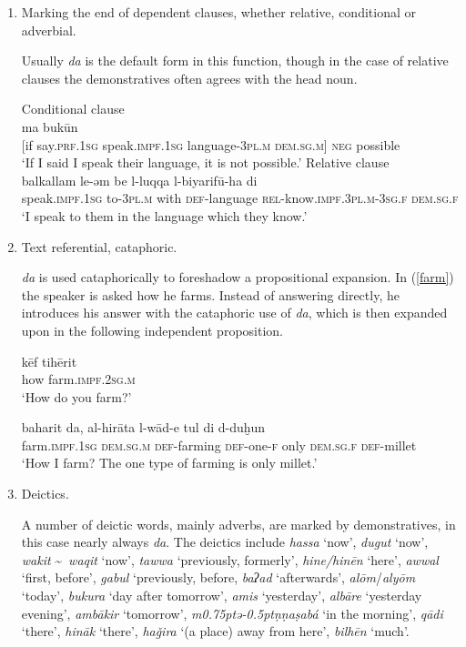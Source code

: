 \documentclass[output=paper]{langsci/langscibook}
\begin{document}
\begin{enumerate}[leftmargin=*]

\item Marking the end of dependent clauses, whether {relative}, {conditional} or adverbial.

Usually \textit{da} is the default form in this function, though in the case of {relative} clauses the {demonstratives} often agrees with the head noun.


\ea\label{gul}
 {\label{bkm:Ref520916112}Conditional clause}\\
 ma bukūn\\
     [if say.\textsc{prf.1sg} speak.\textsc{impf.1sg} language-\textsc{3pl.m} \textsc{dem.sg.m]} \textsc{neg} possible\\
\glt ‘If I said I speak their language, it is not possible.’
\ex \label{luqqa}
{}{}{\label{bkm:Ref520916704}Relative clause}\\
\gll balkallam le-əm be l-luqqa l-biyarifū-ha di\\
     speak.\textsc{impf.1sg} to-\textsc{3pl.m} with \textsc{def}-language \textsc{rel-}know.\textsc{impf.3pl.m-3sg.f} \textsc{dem.sg.f}\\
\glt ‘I speak to them in the language which they know.’
\z

\item Text referential, cataphoric.

\textit{da} is used cataphorically to foreshadow a propositional expansion. In (\ref{farm}) the speaker is asked how he farms. Instead of answering directly, he introduces his answer with the cataphoric use of \textit{da}, which is then expanded upon in the following independent proposition.

\ea\label{farm}
\ea
\gll kēf tihērit\\
     how farm.\textsc{impf.2sg.m}\\
\glt ‘How do you farm?’

\ex
\gll baharit da, al-hirāta l-wād-e tul di d-duḫun\\
     farm.\textsc{impf.1sg} \textsc{dem.sg.m} \textsc{def-}farming \textsc{def-}one-\textsc{f} only \textsc{dem.sg.f} \textsc{def-}millet\\
\glt ‘How I farm? The one type of farming is only millet.’\label{tul}
\z
\z

\item Deictics.

A number of deictic words, mainly adverbs, are marked by {demonstratives}, in this case nearly always \textit{da}. The deictics include \textit{hassa} ‘now’, \textit{dugut} ‘now’, \textit{wakit} {\textasciitilde}~\textit{waqit} ‘now’, \textit{tawwa} ‘previously, formerly’, \textit{hine/hinēn} ‘here’, \textit{awwal} ‘first, before’, \textit{gabul} ‘previously, before, \textit{baʔad} ‘afterwards’, \textit{alōm}/\textit{alyōm} ‘today’, \textit{bukura} ‘day after tomorrow’, \textit{amis} ‘yesterday’, \textit{albāre} ‘yesterday evening’, \textit{ambākir} ‘tomorrow’, \textit{m\kern 0.75ptǝ\kern -0.5ptṇṇaṣabá} ‘in the morning’, \textit{qādi} ‘there’, \textit{hināk} ‘there’, \textit{haǧira} ‘(a place) away from here’, \textit{bilhēn} ‘much’.


\end{enumerate}
\end{document}
